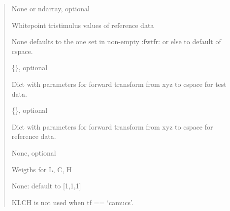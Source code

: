 \documentclass[letterpaper,10pt,english]{sphinxmanual}
\begin{document}
\begin{fulllineitems}
\begin{description}
\begin{quote}
\begin{description}
\item[{xyzwr}] \leavevmode
\begin{DUlineblock}{0em}
\item[] None or ndarray, optional
\item[]
\begin{DUlineblock}{\DUlineblockindent}
\item[] Whitepoint tristimulus values of reference data
\item[]
\begin{DUlineblock}{\DUlineblockindent}
\item[] None defaults to the one set in non-empty :fwtfr: 
or else to default of cspace.
\end{DUlineblock}
\end{DUlineblock}
\end{DUlineblock}

\item[{fwtft}] \leavevmode
\begin{DUlineblock}{0em}
\item[] \{\}, optional
\item[] Dict with parameters for forward transform 
from xyz to cspace for test data.
\end{DUlineblock}

\item[{fwtfr}] \leavevmode
\begin{DUlineblock}{0em}
\item[] \{\}, optional 
\item[] Dict with parameters for forward transform 
from xyz to cspace for reference data.
\end{DUlineblock}

\item[{KLCH}] \leavevmode
\begin{DUlineblock}{0em}
\item[] None, optional
\item[] Weigths for L, C, H 
\item[] None: default to {[}1,1,1{]} 
\item[] KLCH is not used when tf == ‘camucs’.
\end{DUlineblock}


\end{description}
\end{quote}
\end{description}
\end{fulllineitems}
\end{document}
